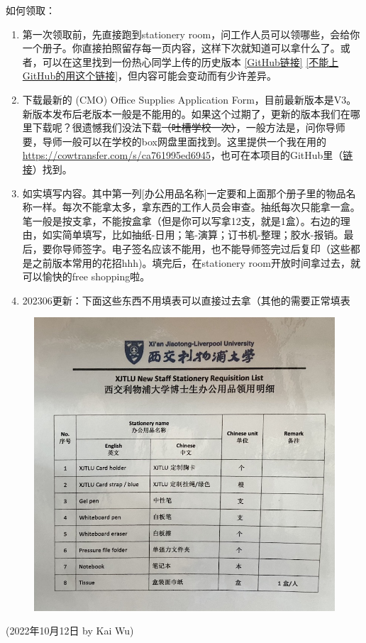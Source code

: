 \hfill\break
如何领取：
\begin{enumerate}
    \item 第一次领取前，先直接跑到stationery room，问工作人员可以领哪些，会给你一个册子。你直接拍照留存每一页内容，这样下次就知道可以拿什么了。或者，可以在这里找到一份热心同学上传的历史版本 \href{https://github.com/kaiwu-astro/xp_pgrs_unofficial_guide/tree/main/fileshare}{[GitHub链接]} \href{https://cowtransfer.com/s/ca761995ed6945}{[不能上GitHub的用这个链接]}，但内容可能会变动而有少许差异。
    \item 下载最新的 (CMO) Office Supplies Application Form，目前最新版本是V3。新版本发布后老版本一般是不能用的。如果这个过期了，更新的版本我们在哪里下载呢？很遗憾我们没法下载\sout{（吐槽学校一次）}，一般方法是，问你导师要，导师一般可以在学校的box网盘里面找到。这里提供一个我在用的 \url{https://cowtransfer.com/s/ca761995ed6945}，也可在本项目的GitHub里（\href{https://github.com/kaiwu-astro/xp_pgrs_unofficial_guide/tree/main/fileshare}{链接}）找到。
    \item 如实填写内容。其中第一列[办公用品名称]一定要和上面那个册子里的物品名称一样。每次不能拿太多，拿东西的工作人员会审查。抽纸每次只能拿一盒。笔一般是按支拿，不能按盒拿（但是你可以写拿12支，就是1盒）。右边的理由，如实简单填写，比如抽纸-日用；笔-演算；订书机-整理；胶水-报销。最后，要你导师签字。电子签名应该不能用，也不能导师签完过后复印（这些都是之前版本常用的花招hhh)。填完后，在stationery room开放时间拿过去，就可以愉快的free shopping啦。
    \item 202306更新：下面这些东西不用填表可以直接过去拿（其他的需要正常填表
\end{enumerate}

\begin{figure}[H]
    \centering
    \includegraphics[width=0.6\columnwidth]{author-folder/Kai.Wu/stationery_no_sign.jpg}
\end{figure}


\begin{flushright}
(2022年10月12日 by Kai Wu)
\end{flushright}

